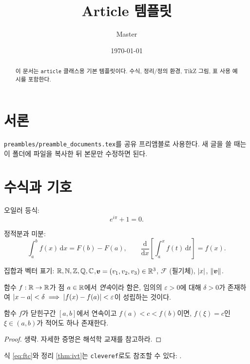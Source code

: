 \documentclass[a4paper,11pt]{article}
\title{Article 템플릿}
\author{Master}
\date{\today}
\begin{document}
\maketitle

\begin{abstract}
  이 문서는 \texttt{article} 클래스용 기본 템플릿이다.
  수식, 정리/정의 환경, TikZ 그림, 표 사용 예시를 포함한다.
\end{abstract}

\tableofcontents

\section{서론}
\texttt{preambles/preamble\_documents.tex}를 공유 프리앰블로 사용한다.
새 글을 쓸 때는 이 폴더에 파일을 복사한 뒤 본문만 수정하면 된다.

\section{수식과 기호}

오일러 등식:
\[
  e^{i\pi} + 1 = 0.
\]

정적분과 미분:
\begin{equation}
  \int_a^b f(x)\,\mathrm{d}x = F(b) - F(a),
  \qquad
  \frac{\mathrm{d}}{\mathrm{d}x}\!\left[ \int_a^x f(t)\,\mathrm{d}t \right] = f(x).
  \label{eq:ftc}
\end{equation}

집합과 벡터 표기: $\mathbb{R}, \mathbb{N}, \mathbb{Z}, \mathbb{Q}, \mathbb{C}$,\quad $\bm{v} = (v_1, v_2, v_3) \in \mathbb{R}^3$,
\quad $\mathscr{F}$ (필기체), \quad $\lvert x\rvert$, $\lVert\bm{v}\rVert$.

\begin{definition}[연속함수]
  함수 $f : \mathbb{R} \to \mathbb{R}$가 점 $a \in \mathbb{R}$에서 \emph{연속}이라 함은, 임의의 $\varepsilon > 0$에 대해
  $\delta > 0$가 존재하여 $\lvert x-a\rvert < \delta \implies \lvert f(x)-f(a)\rvert < \varepsilon$이 성립하는 것이다.
\end{definition}

\begin{theorem}[중간값 정리]
  \label{thm:ivt}
  함수 $f$가 닫힌구간 $[a,b]$에서 연속이고 $f(a) < c < f(b)$이면,
  $f(\xi) = c$인 $\xi \in (a,b)$가 적어도 하나 존재한다.
\end{theorem}
\begin{proof}
  생략. 자세한 증명은 해석학 교재를 참고하라.
\end{proof}

\begin{example}
  식 \eqref{eq:ftc}와 정리 \ref{thm:ivt}는 \texttt{cleveref}로도 참조할 수 있다: .
\end{example}
\end{document}
